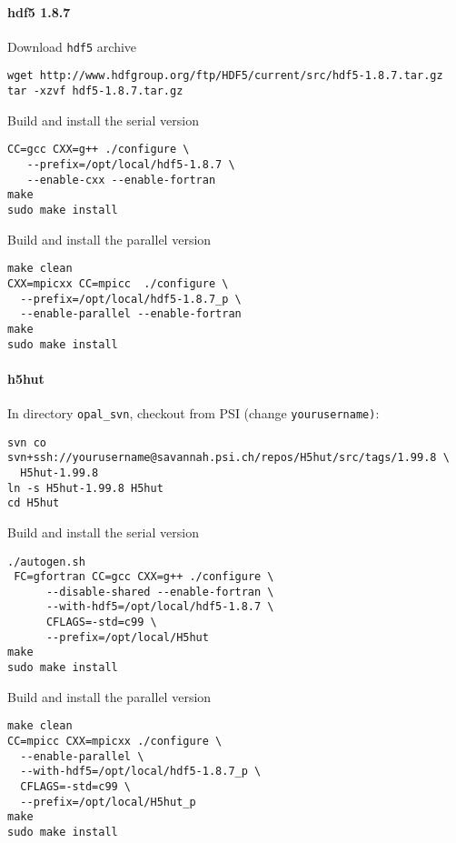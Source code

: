 \paragraph{hdf5 1.8.7}
Download {\tt hdf5} archive
\begin{footnotesize}
\begin{verbatim}
wget http://www.hdfgroup.org/ftp/HDF5/current/src/hdf5-1.8.7.tar.gz
tar -xzvf hdf5-1.8.7.tar.gz 
\end{verbatim}
\end{footnotesize}
Build and install the serial version
\begin{footnotesize}
\begin{verbatim}
CC=gcc CXX=g++ ./configure \
   --prefix=/opt/local/hdf5-1.8.7 \
   --enable-cxx --enable-fortran
make
sudo make install
\end{verbatim}
\end{footnotesize}
Build and install the parallel version
\begin{footnotesize}
\begin{verbatim}
make clean
CXX=mpicxx CC=mpicc  ./configure \
  --prefix=/opt/local/hdf5-1.8.7_p \
  --enable-parallel --enable-fortran
make
sudo make install
\end{verbatim}
\end{footnotesize}

\paragraph{h5hut}
In directory \verb+opal_svn+, checkout from PSI (change {\tt yourusername)}:
\begin{footnotesize}
\begin{verbatim}
svn co svn+ssh://yourusername@savannah.psi.ch/repos/H5hut/src/tags/1.99.8 \
  H5hut-1.99.8
ln -s H5hut-1.99.8 H5hut
cd H5hut
\end{verbatim}
\end{footnotesize}
Build and install the serial version
\begin{footnotesize}
\begin{verbatim}
./autogen.sh
 FC=gfortran CC=gcc CXX=g++ ./configure \
      --disable-shared --enable-fortran \
      --with-hdf5=/opt/local/hdf5-1.8.7 \
      CFLAGS=-std=c99 \
      --prefix=/opt/local/H5hut 
make
sudo make install
\end{verbatim}
\end{footnotesize}
Build and install the parallel version
\begin{footnotesize}
\begin{verbatim}
make clean
CC=mpicc CXX=mpicxx ./configure \
  --enable-parallel \
  --with-hdf5=/opt/local/hdf5-1.8.7_p \
  CFLAGS=-std=c99 \
  --prefix=/opt/local/H5hut_p 
make
sudo make install
\end{verbatim}
\end{footnotesize}

